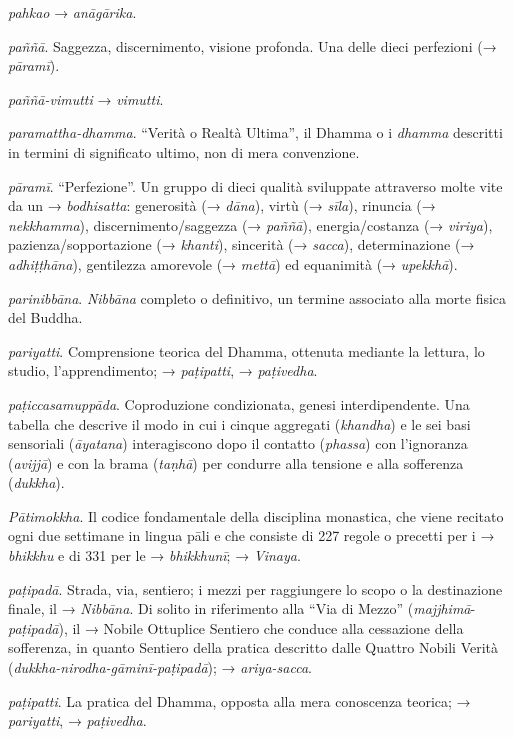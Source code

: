 \emph{pahkao} → \emph{anāgārika}.

\emph{paññā}. Saggezza, discernimento, visione profonda. Una delle dieci
perfezioni (→ \emph{pāramī}).

\emph{paññā-vimutti} → \emph{vimutti}.

\emph{paramattha-dhamma}. ``Verità o Realtà Ultima'', il Dhamma o i
\emph{dhamma} descritti in termini di significato ultimo, non di mera
convenzione.

\emph{pāramī}. ``Perfezione''. Un gruppo di dieci qualità sviluppate
attraverso molte vite da un → \emph{bodhisatta}: generosità (→
\emph{dāna}), virtù (→ \emph{sīla}), rinuncia (→ \emph{nekkhamma}),
discernimento/saggezza (→ \emph{paññā}), energia/costanza (→
\emph{viriya}), pazienza/sopportazione (→ \emph{khanti}), sincerità (→
\emph{sacca}), determinazione (→ \emph{adhiṭṭhāna}), gentilezza
amorevole (→ \emph{mettā}) ed equanimità (→ \emph{upekkhā}).

\emph{parinibbāna}. \emph{Nibbāna} completo o definitivo, un termine
associato alla morte fisica del Buddha.

\emph{pariyatti}. Comprensione teorica del Dhamma, ottenuta mediante la
lettura, lo studio, l'apprendimento; → \emph{paṭipatti}, →
\emph{paṭivedha}.

\emph{paṭiccasamuppāda}. Coproduzione condizionata, genesi
interdipendente. Una tabella che descrive il modo in cui i cinque
aggregati (\emph{khandha}) e le sei basi sensoriali (\emph{āyatana})
interagiscono dopo il contatto (\emph{phassa}) con l'ignoranza
(\emph{avijjā}) e con la brama (\emph{taṇhā}) per condurre alla tensione
e alla sofferenza (\emph{dukkha}).

\emph{Pātimokkha}. Il codice fondamentale della disciplina monastica,
che viene recitato ogni due settimane in lingua pāli e che consiste di
227 regole o precetti per i → \emph{bhikkhu} e di 331 per le →
\emph{bhikkhunī}; → \emph{Vinaya}.

\emph{paṭipadā}. Strada, via, sentiero; i mezzi per raggiungere lo scopo
o la destinazione finale, il → \emph{Nibbāna}. Di solito in riferimento
alla ``Via di Mezzo'' (\emph{majjhimā}-\emph{paṭipadā}), il → Nobile
Ottuplice Sentiero che conduce alla cessazione della sofferenza, in
quanto Sentiero della pratica descritto dalle Quattro Nobili Verità
(\emph{dukkha-nirodha-gāminī-paṭipadā}); → \emph{ariya-sacca}.

\emph{paṭipatti}. La pratica del Dhamma, opposta alla mera conoscenza
teorica; → \emph{pariyatti}, → \emph{paṭivedha}.

